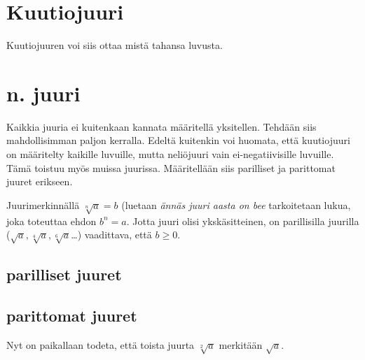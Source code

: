 \section{Kuutiojuuri}

Kuutiojuuren voi siis ottaa mistä tahansa luvusta.

\section{n. juuri}
Kaikkia juuria ei kuitenkaan kannata määritellä yksitellen. Tehdään siis mahdollisimman paljon kerralla. Edeltä kuitenkin voi huomata, että kuutiojuuri on määritelty kaikille luvuille, mutta neliöjuuri vain ei-negatiivisille luvuille. Tämä toistuu myös muissa juurissa. Määritellään siis parilliset ja parittomat juuret erikseen.

Juurimerkinnällä $\sqrt[n]{a}=b$ (luetaan \emph{ännäs juuri aasta on bee} tarkoitetaan lukua, joka toteuttaa ehdon $b^n = a$. Jotta juuri olisi ykskäsitteinen, on parillisilla juurilla ($\sqrt{a}, \sqrt[4]{a}, \sqrt[6]{a}$\ldots) vaadittava, että $b\ge0$.

\subsection{parilliset juuret}


\subsection{parittomat juuret}

Nyt on paikallaan todeta, että toista juurta $\sqrt[2]{a}$ merkitään $\sqrt{a}$.


